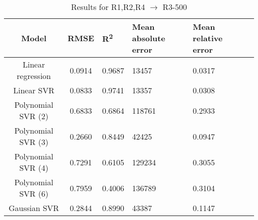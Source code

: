 \begin{table}[H]
\centering
\begin{adjustbox}{center}
\begin{tabular}{c | c M{1.2cm} M{2.5cm} M{2.5cm} M{1.8cm}}
Model & RMSE & R\textsuperscript{2} & Mean absolute error & Mean relative error \tabularnewline
\hline
Linear regression & 0.0914 & 0.9687 &  13457 & 0.0317 \\
Linear SVR & 0.0833 & 0.9741 &  13357 & 0.0308 \\
Polynomial SVR (2) & 0.6833 & 0.6864 & 118761 & 0.2933 \\
Polynomial SVR (3) & 0.2660 & 0.8449 &  42425 & 0.0947 \\
Polynomial SVR (4) & 0.7291 & 0.6105 & 129234 & 0.3055 \\
Polynomial SVR (6) & 0.7959 & 0.4006 & 136789 & 0.3104 \\
Gaussian SVR & 0.2844 & 0.8990 &  43387 & 0.1147 \\
\end{tabular}
\end{adjustbox}
\\
\caption{Results for R1,R2,R4 $\rightarrow$ R3-500}
\label{tab:coreonly_linear_R1,R2,R4_R3_500}
\end{table}
